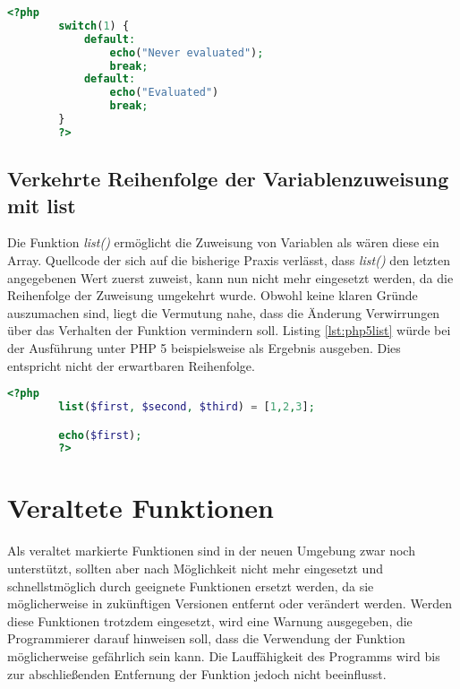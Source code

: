     \begin{lstlisting}[language=php, caption={Beispiel meherer default-Blöcke in Switch-Anweisungen}, label={lst:php5switch}]
        <?php
        switch(1) {
            default:
                echo("Never evaluated");
                break;
            default:
                echo("Evaluated")
                break;
        }
        ?>
    \end{lstlisting}

    \subsection{Verkehrte Reihenfolge der Variablenzuweisung mit list}
    Die Funktion \textit{list()} ermöglicht die Zuweisung von Variablen als wären diese ein Array. Quellcode der sich auf die bisherige Praxis verlässt, dass \textit{list()}
    den letzten angegebenen Wert zuerst zuweist, kann nun nicht mehr eingesetzt werden, da die Reihenfolge der Zuweisung umgekehrt wurde. 
    Obwohl keine klaren Gründe auszumachen sind, liegt die Vermutung nahe, dass die Änderung Verwirrungen über das Verhalten der Funktion vermindern soll. Listing
    \ref{lst:php5list} würde bei der Ausführung unter \acs{PHP} 5 beispielsweise \grqq{} als Ergebnis ausgeben. Dies entspricht nicht der erwartbaren Reihenfolge.

    \begin{lstlisting}[language=php, caption={Beispiel der Verwendung von list()}, label={lst:php5list}]
        <?php
        list($first, $second, $third) = [1,2,3];

        echo($first);
        ?>
    \end{lstlisting}

\section{Veraltete Funktionen}
Als veraltet markierte Funktionen sind in der neuen Umgebung zwar noch unterstützt, sollten aber nach Möglichkeit nicht mehr eingesetzt und schnellstmöglich durch geeignete 
Funktionen ersetzt werden, da sie möglicherweise in zukünftigen Versionen entfernt oder verändert werden. Werden diese Funktionen trotzdem eingesetzt, wird eine Warnung 
ausgegeben, die Programmierer darauf hinweisen soll, dass die Verwendung der Funktion möglicherweise gefährlich sein kann. Die Lauffähigkeit des Programms wird bis zur 
abschließenden Entfernung der Funktion jedoch nicht beeinflusst. \cite{oracle_how_2004}
